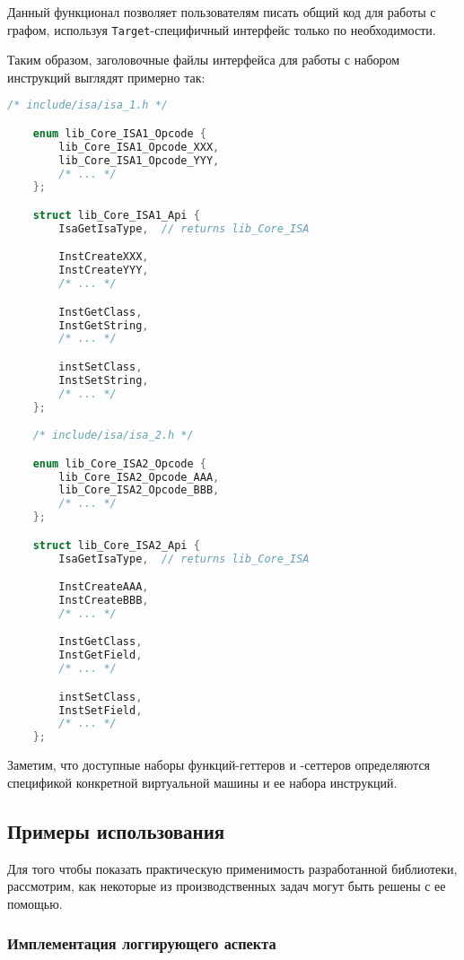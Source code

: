 Данный функционал позволяет пользователям писать общий код для работы с графом, используя \texttt{Target}-специфичный интерфейс только по необходимости.

Таким образом, заголовочные файлы интерфейса для работы с набором инструкций выглядят примерно так:

\begin{lstlisting}[language=C, label=lst:libIsaApi]
    /* include/isa/isa_1.h */

    enum lib_Core_ISA1_Opcode {
        lib_Core_ISA1_Opcode_XXX,
        lib_Core_ISA1_Opcode_YYY,
        /* ... */
    };

    struct lib_Core_ISA1_Api {
        IsaGetIsaType,  // returns lib_Core_ISA

        InstCreateXXX,
        InstCreateYYY,
        /* ... */

        InstGetClass,
        InstGetString,
        /* ... */

        instSetClass,
        InstSetString,
        /* ... */
    };

    /* include/isa/isa_2.h */

    enum lib_Core_ISA2_Opcode {
        lib_Core_ISA2_Opcode_AAA,
        lib_Core_ISA2_Opcode_BBB,
        /* ... */
    };

    struct lib_Core_ISA2_Api {
        IsaGetIsaType,  // returns lib_Core_ISA

        InstCreateAAA,
        InstCreateBBB,
        /* ... */

        InstGetClass,
        InstGetField,
        /* ... */

        instSetClass,
        InstSetField,
        /* ... */
    };
\end{lstlisting}

Заметим, что доступные наборы функций-геттеров и -сеттеров определяются спецификой конкретной виртуальной машины и ее набора инструкций.

\subsection{Примеры использования}

Для того чтобы показать практическую применимость разработанной библиотеки, рассмотрим, как некоторые из производственных задач могут быть решены с ее помощью.

\subsubsection{Имплементация логгирующего аспекта}


